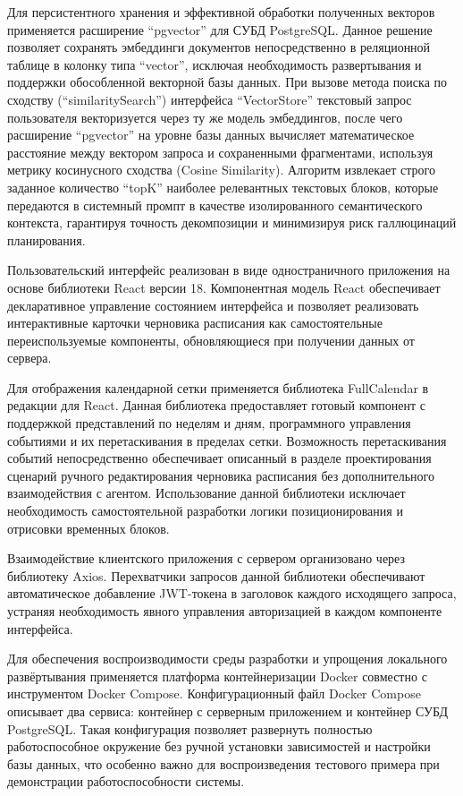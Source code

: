 Для персистентного хранения и эффективной обработки полученных векторов применяется расширение ``pgvector'' для СУБД PostgreSQL. Данное решение позволяет сохранять эмбеддинги документов непосредственно в реляционной таблице в колонку типа ``vector'', исключая необходимость развертывания и поддержки обособленной векторной базы данных. При вызове метода поиска по сходству (``similaritySearch'') интерфейса ``VectorStore'' текстовый запрос пользователя векторизуется через ту же модель эмбеддингов, после чего расширение ``pgvector'' на уровне базы данных вычисляет математическое расстояние между вектором запроса и сохраненными фрагментами, используя метрику косинусного сходства (Cosine Similarity). Алгоритм извлекает строго заданное количество ``topK'' наиболее релевантных текстовых блоков, которые передаются в системный промпт в качестве изолированного семантического контекста, гарантируя точность декомпозиции и минимизируя риск галлюцинаций планирования.

\numberedparagraph
Пользовательский интерфейс реализован в виде одностраничного приложения на основе библиотеки React версии 18. Компонентная модель React обеспечивает декларативное управление состоянием интерфейса и позволяет реализовать интерактивные карточки черновика расписания как самостоятельные переиспользуемые компоненты, обновляющиеся при получении данных от сервера.

Для отображения календарной сетки применяется библиотека FullCalendar в редакции для React. Данная библиотека предоставляет готовый компонент с поддержкой представлений по неделям и дням, программного управления событиями и их перетаскивания в пределах сетки. Возможность перетаскивания событий непосредственно обеспечивает описанный в разделе проектирования сценарий ручного редактирования черновика расписания без дополнительного взаимодействия с агентом. Использование данной библиотеки исключает необходимость самостоятельной разработки логики позиционирования и отрисовки временных блоков.

Взаимодействие клиентского приложения с сервером организовано через библиотеку Axios. Перехватчики запросов данной библиотеки обеспечивают автоматическое добавление JWT-токена в заголовок каждого исходящего запроса, устраняя необходимость явного управления авторизацией в каждом компоненте интерфейса.

\numberedparagraph
Для обеспечения воспроизводимости среды разработки и упрощения локального развёртывания применяется платформа контейнеризации Docker совместно с инструментом Docker Compose. Конфигурационный файл Docker Compose описывает два сервиса: контейнер с серверным приложением и контейнер СУБД PostgreSQL. Такая конфигурация позволяет развернуть полностью работоспособное окружение без ручной установки зависимостей и настройки базы данных, что особенно важно для воспроизведения тестового примера при демонстрации работоспособности системы.


